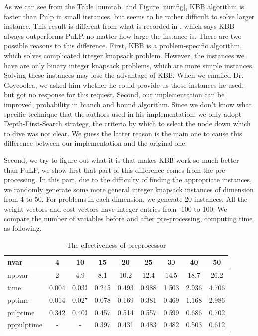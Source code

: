 \documentclass[a4paper,11pt]{article}
\begin{document}
As we can see from the Table \ref{numtab} and Figure \ref{numfig}, KBB algorithm is faster than Pulp in small instances, but seems to be rather difficult to solve larger instance. This result is different from what is recorded in \cite{fukasawa2011exact}, which says KBB always outperforms PuLP, no matter how large the instance is. There are two possible reasons to this difference. First, KBB is a problem-specific algorithm, which solves complicated integer knapsack problem. However, the instances we have are only binary integer knapsack problems, which are more simple instances. Solving these instances may lose the advantage of KBB. When we emailed Dr. Goycoolea, we asked him whether he could provide us those instances he used, but got no response for this request. Second, our implementation can be improved, probability in branch and bound algorithm. Since we don't know what specific technique that the authors used in his implementation, we only adopt Depth-First-Search strategy, the criteria by which to select the node down which to dive was not clear. We guess the latter reason is the main one to cause this difference between our implementation and the original one.

Second, we try to figure out what it is that makes KBB work so much better than PuLP,  we show first that part of this difference comes from the pre-processing. In this part, due to the difficulty of finding the appropriate instances, we randomly generate some more general integer knapsack instances of dimension from 4 to 50. For problems in each dimension, we generate 20 instances.  All the weight vectors and cost vectors have integer entries from -100 to 100. We compare the number of variables before and after pre-processing, computing time as following.

\begin{table}[H]
\begin{center}
\begin{tabular}{l c c c c c c c c}
\hline
nvar&4&10&15&20&25&30&40&50\\
\hline
nppvar &2&4.9 &8.1 &10.2 &12.4 &14.5 &18.7 &26.2\\
time&0.004&0.033&0.245&0.493&0.988&1.503&2.936&4.706\\
pptime&0.014&0.027&0.078&0.169&0.381&0.469&1.168&2.986\\
pulptime&0.342&0.403&0.457&0.514&0.557&0.599&0.686&0.702\\
pppulptime&-&-&0.397&0.431&0.483&0.482&0.503&0.612\\
\hline
\end{tabular}
\end{center}
\caption{The effectiveness of preprocessor \label{t3}}
\end{table}
\end{document}
